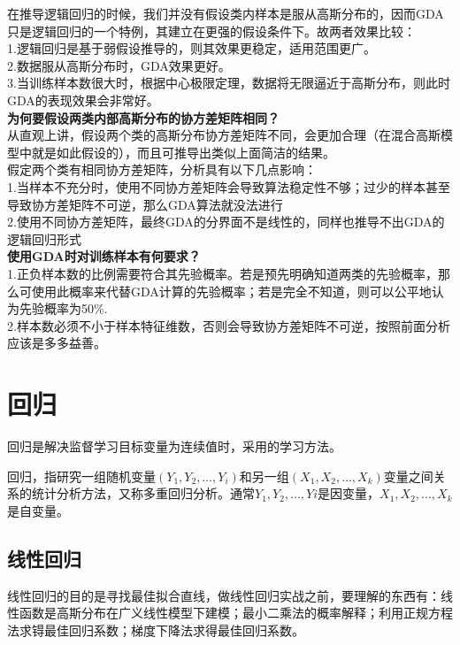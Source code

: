 在推导逻辑回归的时候，我们并没有假设类内样本是服从高斯分布的，因而GDA只是逻辑回归的一个特例，其建立在更强的假设条件下。故两者效果比较：\\
1.逻辑回归是基于弱假设推导的，则其效果更稳定，适用范围更广。\\
2.数据服从高斯分布时，GDA效果更好。\\
3.当训练样本数很大时，根据中心极限定理，数据将无限逼近于高斯分布，则此时GDA的表现效果会非常好。\\

\noindent\textbf{为何要假设两类内部高斯分布的协方差矩阵相同？}\\
从直观上讲，假设两个类的高斯分布协方差矩阵不同，会更加合理（在混合高斯模型中就是如此假设的），而且可推导出类似上面简洁的结果。\\
假定两个类有相同协方差矩阵，分析具有以下几点影响：\\
1.当样本不充分时，使用不同协方差矩阵会导致算法稳定性不够；过少的样本甚至导致协方差矩阵不可逆，那么GDA算法就没法进行\\
2.使用不同协方差矩阵，最终GDA的分界面不是线性的，同样也推导不出GDA的逻辑回归形式\\

\noindent\textbf{使用GDA时对训练样本有何要求？}\\
1.正负样本数的比例需要符合其先验概率。若是预先明确知道两类的先验概率，那么可使用此概率来代替GDA计算的先验概率；若是完全不知道，则可以公平地认为先验概率为50\%.\\
2.样本数必须不小于样本特征维数，否则会导致协方差矩阵不可逆，按照前面分析应该是多多益善。


\newpage
\section{回归}
回归是解决监督学习目标变量为连续值时，采用的学习方法。

回归，指研究一组随机变量$(Y_1,Y_2,\ldots,Y_i)$和另一组$(X_1,X_2,\ldots,X_k)$变量之间关系的统计分析方法，又称多重回归分析。通常$Y_1,Y_2,\ldots,Yi$是因变量，$X_1,X_2,\ldots,X_k$是自变量。

\subsection{线性回归}
线性回归的目的是寻找最佳拟合直线，做线性回归实战之前，要理解的东西有：线性函数是高斯分布在广义线性模型下建模；最小二乘法的概率解释；利用正规方程法求锝最佳回归系数；梯度下降法求得最佳回归系数。


